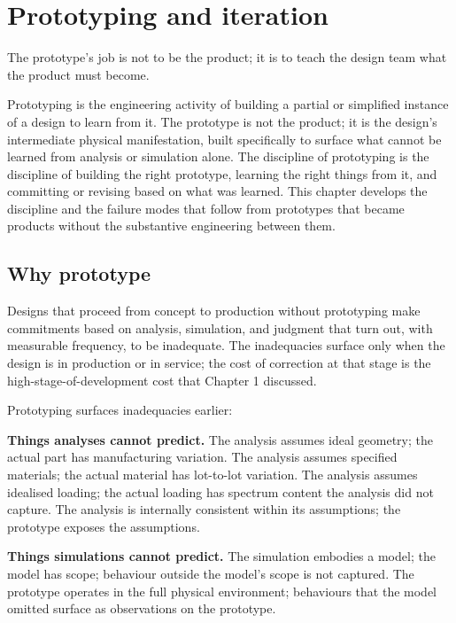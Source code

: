 \chapter{Prototyping and iteration}
\label{vol11:ch07}

\epigraph{The prototype's job is not to be the product; it is to teach the design team what the product must become.}{}


\noindent
Prototyping is the engineering activity of building a partial or simplified instance of a design to learn from it. The prototype is not the product; it is the design's intermediate physical manifestation, built specifically to surface what cannot be learned from analysis or simulation alone. The discipline of prototyping is the discipline of building the right prototype, learning the right things from it, and committing or revising based on what was learned. This chapter develops the discipline and the failure modes that follow from prototypes that became products without the substantive engineering between them.

\section{Why prototype}

Designs that proceed from concept to production without prototyping make commitments based on analysis, simulation, and judgment that turn out, with measurable frequency, to be inadequate. The inadequacies surface only when the design is in production or in service; the cost of correction at that stage is the high-stage-of-development cost that Chapter 1 discussed.

Prototyping surfaces inadequacies earlier:

\textbf{Things analyses cannot predict.} The analysis assumes ideal geometry; the actual part has manufacturing variation. The analysis assumes specified materials; the actual material has lot-to-lot variation. The analysis assumes idealised loading; the actual loading has spectrum content the analysis did not capture. The analysis is internally consistent within its assumptions; the prototype exposes the assumptions.

\textbf{Things simulations cannot predict.} The simulation embodies a model; the model has scope; behaviour outside the model's scope is not captured. The prototype operates in the full physical environment; behaviours that the model omitted surface as observations on the prototype.

